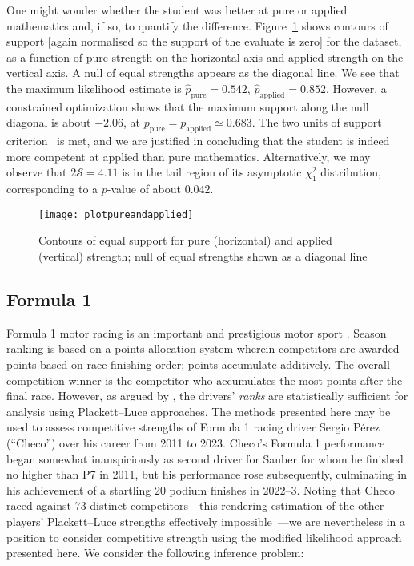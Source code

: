 \documentclass[article]{ajs}
\begin{document}
One might wonder whether the student was better at pure or applied
mathematics and, if so, to quantify the difference.
Figure~\ref{plotpureandapplied} shows contours of support [again
  normalised so the support of the evaluate is zero] for the dataset,
as a function of pure strength on the horizontal axis and applied
strength on the vertical axis.  A null of equal strengths appears as
the diagonal line.  We see that the maximum likelihood estimate is
$\hat{p}_\mathrm{pure}=0.542$, $\hat{p}_\mathrm{applied}=0.852$.
However, a constrained optimization shows that the maximum support
along the null diagonal is about $-2.06$, at
${p}_\mathrm{pure}={p}_\mathrm{applied}\simeq 0.683$.  The two units of
support criterion~\citep{edwards1992} is met, and we are justified in
concluding that the student is indeed more competent at applied than
pure mathematics.  Alternatively, we may observe that
$2\mathcal{S}=4.11$ is in the tail region of its asymptotic $\chi^2_1$
distribution, corresponding to a $p$-value of about $0.042$.

\begin{figure}
\begin{centering}
\texttt{[image: plotpureandapplied]}  %
\caption{Contours of equal support for pure (horizontal) and applied
  (vertical) strength; null of equal strengths shown as a diagonal
  line \label{plotpureandapplied}}
\end{centering}
\end{figure}


\subsection{Formula 1}

Formula 1 motor racing is an important and prestigious motor sport
\citep{codling2017,jenkins2010}.  Season ranking is based on a points
allocation system wherein competitors are awarded points based on race
finishing order; points accumulate additively.  The overall
competition winner is the competitor who accumulates the most points
after the final race.  However, as argued by
\cite{hankin2023_formula1points}, the drivers' {\em ranks} are
statistically sufficient for analysis using Plackett--Luce approaches.
The methods presented here may be used to assess competitive strengths
of Formula 1 racing driver Sergio P\'{e}rez (``Checo'') over his
career from 2011 to 2023.  Checo's Formula 1 performance began
somewhat inauspiciously as second driver for Sauber for whom he
finished no higher than P7 in 2011, but his performance rose
subsequently, culminating in his achievement of a startling 20 podium
finishes in 2022--3.  Noting that Checo raced against 73 distinct
competitors---this rendering estimation of the other players'
Plackett--Luce strengths effectively
impossible~\citep{hankin2020}---we are nevertheless in a position to
consider competitive strength using the modified likelihood approach
presented here.  We consider the following inference problem:
\end{document}
